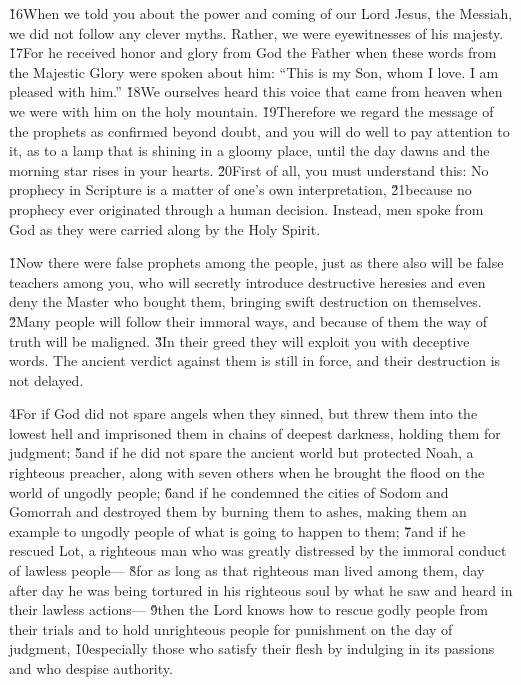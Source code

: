 \v{16}When we told you about the power and coming of our Lord Jesus, the Messiah, we did not follow any clever myths. Rather, we were eyewitnesses of his majesty. \v{17}For he received honor and glory from God the Father when these words from the Majestic Glory were spoken about him: ``This is my Son, whom I love. I am pleased with him.'' \v{18}We ourselves heard this voice that came from heaven when we were with him on the holy mountain. \v{19}Therefore we regard the message of the prophets as confirmed beyond doubt, and you will do well to pay attention to it, as to a lamp that is shining in a gloomy place, until the day dawns and the morning star rises in your hearts. \v{20}First of all, you must understand this: No prophecy in Scripture is a matter of one's own interpretation, \v{21}because no prophecy ever originated through a human decision. Instead, men spoke from God as they were carried along by the Holy Spirit.

\v{1}Now there were false prophets among the people, just as there also will be false teachers among you, who will secretly introduce destructive heresies and even deny the Master who bought them, bringing swift destruction on themselves. \v{2}Many people will follow their immoral ways, and because of them the way of truth will be maligned. \v{3}In their greed they will exploit you with deceptive words. The ancient verdict against them is still in force, and their destruction is not delayed.

\v{4}For if God did not spare angels when they sinned, but threw them into the lowest hell and imprisoned them in chains of deepest darkness, holding them for judgment; \v{5}and if he did not spare the ancient world but protected Noah, a righteous preacher, along with seven others when he brought the flood on the world of ungodly people; \v{6}and if he condemned the cities of Sodom and Gomorrah and destroyed them by burning them to ashes, making them an example to ungodly people of what is going to happen to them; \v{7}and if he rescued Lot, a righteous man who was greatly distressed by the immoral conduct of lawless people--- \v{8}for as long as that righteous man lived among them, day after day he was being tortured in his righteous soul by what he saw and heard in their lawless actions--- \v{9}then the Lord knows how to rescue godly people from their trials and to hold unrighteous people for punishment on the day of judgment, \v{10}especially those who satisfy their flesh by indulging in its passions and who despise authority.


